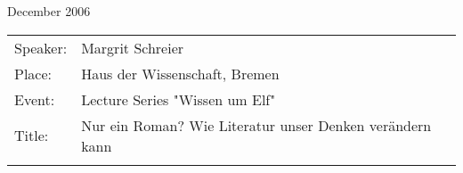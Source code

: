 {\begin{flushleft}
December 2006\\[0.5cm]
\end{flushleft}
\begin{tabular}{lp{13.4cm}}
 Speaker:	& Margrit Schreier \\
 Place: 	 &Haus der Wissenschaft, Bremen\\
 Event:   &	Lecture Series "Wissen um Elf" \\
 Title: &	Nur ein Roman? Wie Literatur unser Denken ver\"{a}ndern kann\\ \\
\end{tabular}
	
}
